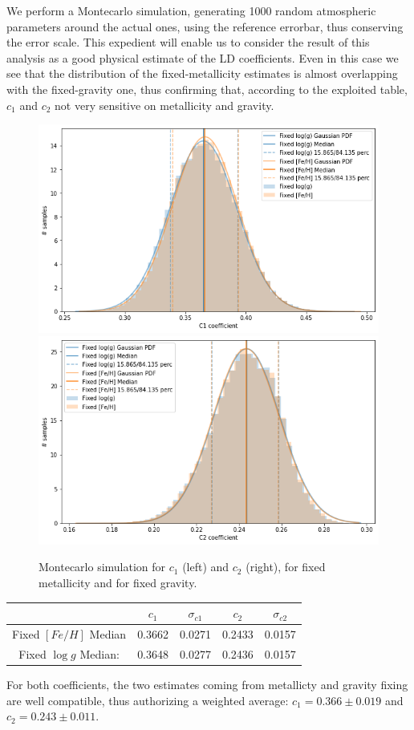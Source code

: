 \documentclass[a4paper,11pt,twocolumn]{article}
\begin{document}
We perform a Montecarlo simulation, generating 1000 random atmospheric 
parameters around the actual ones, using the reference errorbar, 
thus conserving the error scale. This expedient will enable us 
to consider the result of this analysis as a good physical 
estimate of the LD coefficients. 
Even in this case we see that the 
distribution of the fixed-metallicity estimates is almost overlapping 
with the fixed-gravity one, thus confirming that, according to the 
exploited table, $c_1$ and $c_2$ not very sensitive on metallicity and gravity.
\begin{figure}[H]
    \centering  
    \includegraphics[scale=0.35, angle=0]{../pictures/Claret2017/2017_c1_comp}
    \includegraphics[scale=0.35, angle=0]{../pictures/Claret2017/2017_c2_comp}
    \caption{Montecarlo simulation for $c_1$ (left) and $c_2$ (right), 
    for fixed metallicity and for fixed gravity.}
\end{figure}
\begin{table}[h!]
	\centering
	\begin{tabular}{ccccc}
		\hline
		& $c_1$ & $\sigma_{c1}$ & $c_2$ & $\sigma_{c2}$\\
		\hline
		Fixed $[Fe/H]$ Median   & 0.3662 & 0.0271 & 0.2433 & 0.0157\\
		Fixed $\log{g}$ Median: & 0.3648 & 0.0277 & 0.2436 & 0.0157 \\
		\hline
	\end{tabular} 
\end{table}
For both coefficients, the two estimates coming from metallicty and 
gravity fixing are well compatible, thus authorizing a weighted average: 
$c_1 = 0.366 \pm 0.019$ and $c_2 = 0.243 \pm 0.011$.
\end{document}
